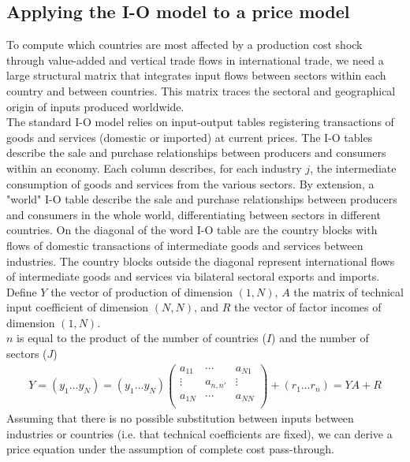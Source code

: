 \documentclass[11pt,a4paper]{article}
\begin{document}
\subsection{Applying the I-O model to a price model}
\label{subsec:ioprice}
To compute which countries are most affected by a production cost shock through value-added and vertical trade flows in international trade, we need a large structural matrix that integrates input flows between sectors within each country and between countries. This matrix traces the sectoral and geographical origin of inputs produced worldwide. \\
The standard I-O model relies on input-output tables registering transactions of goods and services (domestic or imported) at current prices. The I-O tables describe the sale and purchase relationships between producers and consumers within an economy. Each column describes, for each industry $j$, the intermediate consumption of goods and services from the various sectors.
By extension, a "world" I-O table describe the sale and purchase relationships between producers and consumers in the whole world, differentiating between sectors in different countries. On the diagonal of the word I-O table are the country blocks with flows of domestic transactions of intermediate goods and services between industries. The country blocks outside the diagonal represent international flows of intermediate goods and services via bilateral sectoral exports and imports. \\
Define $Y$ the vector of production of dimension $(1, N)$, $A$ the matrix of technical input coefficient of dimension $(N, N)$, and $R$ the vector of factor incomes of dimension $(1, N)$.\\
$n$ is equal to the product of the number of countries ($I$) and the number of sectors ($J$)
\begin{eqnarray*}
	Y=(y_1\ldots y_N)=\left(y_1\ldots y_N\right)\left( \begin{matrix}
   a_{11} & \cdots  & a_{N1}  \\
   \vdots  & a_{n,n'} & \vdots   \\
   a_{1N} & \cdots  & a_{NN}  \\
\end{matrix} \right)+(r_1\ldots r_n)=YA+R
\end{eqnarray*}
Assuming that there is no possible substitution between inputs between industries or countries (i.e. that technical coefficients are fixed), we can derive a price equation under the assumption of complete cost pass-through.\\
\end{document}
